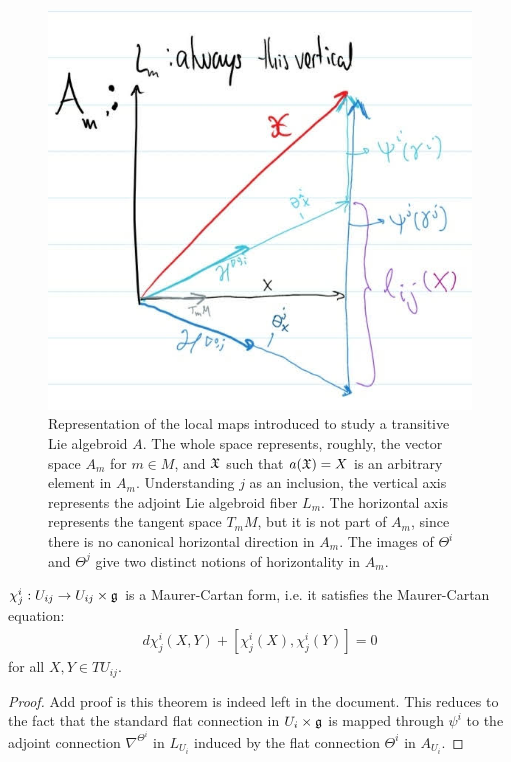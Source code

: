 \begin{figure}[t]
    \centering
    \includegraphics[width = \textwidth/2]{images/DiagramaMapasLocalesAlgebroide.jpg}
    \caption{Representation of the local maps introduced to study a transitive Lie algebroid $A$. The whole space represents, roughly, the vector space $A_m$ for $m \in M$, and $\mathfrak{X}$ such that $a(\mathfrak{X}) = X$ is an arbitrary element in $A_m$. Understanding $j$ as an inclusion, the vertical axis represents the adjoint Lie algebroid fiber $L_m$. The horizontal axis represents the tangent space $T_m M$, but it is not part of $A_m$, since there is no canonical horizontal direction in $A_m$. The images of $\Theta^i$ and $\Theta^j$ give two distinct notions of horizontality in $A_m$.}
    \label{fig:localMaps}
\end{figure}

\begin{theorem}
$\chi^i_j: U_{ij} \to U_{ij} \times \mathfrak{g}$ is a Maurer-Cartan form, i.e. it satisfies the Maurer-Cartan equation:
\begin{align*}
    d \chi^i_j(X, Y) + [\chi^i_j(X), \chi^i_j(Y)] = 0
\end{align*} for all $X, Y \in TU_{ij}$.
\end{theorem}

\begin{proof}
Add proof is this theorem is indeed left in the document. This reduces to the fact that the standard flat connection in $U_i \times \mathfrak{g}$ is mapped through $\psi^i$ to the adjoint connection $\nabla^{\Theta^i}$ in $L_{U_i}$ induced by the flat connection $\Theta^i$ in $A_{U_i}$. 
\end{proof}

